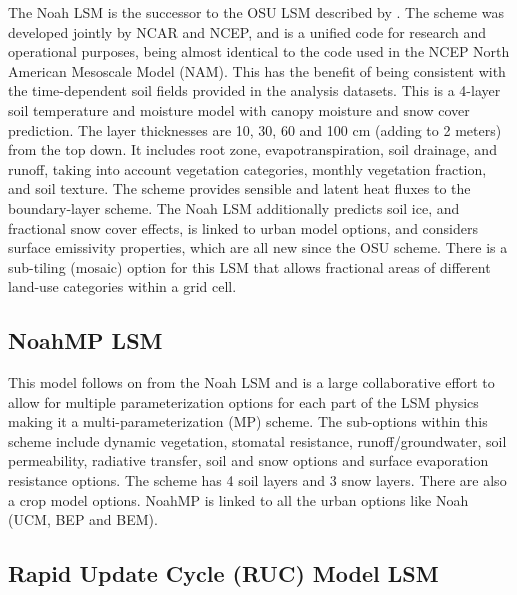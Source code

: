 The Noah LSM is the successor to the OSU LSM described by \citet{chendudhia01}. 
The scheme was developed jointly by NCAR and NCEP, and is a unified
code for research and operational purposes, being almost identical
to the code used in the NCEP North American Mesoscale Model (NAM). This has the benefit of 
being consistent with the time-dependent soil fields provided in the analysis datasets.
This is a 4-layer soil temperature and moisture model with canopy 
moisture and snow cover prediction. The layer thicknesses are 10, 30, 60 and 100 cm
(adding to 2 meters) from the top down. It includes root zone, evapotranspiration,
soil drainage, and runoff, taking into account vegetation categories,
monthly vegetation fraction, and soil texture. The scheme provides sensible and latent 
heat fluxes to the boundary-layer scheme. The Noah LSM additionally predicts 
soil ice, and fractional snow cover effects, is linked to urban model options,
and considers surface emissivity properties, which are all new since the OSU
scheme. There is a sub-tiling (mosaic) option for this LSM \citep{li13} that allows
fractional areas of different land-use categories within a grid cell.

\subsection{NoahMP LSM}

This model follows on from the Noah LSM and is a large collaborative effort \citep{niu11, yang11} to allow for multiple parameterization options
for each part of the LSM physics making it a multi-parameterization (MP) scheme. The sub-options within this scheme
include dynamic vegetation, stomatal resistance, runoff/groundwater, soil permeability, radiative transfer, soil and snow
options and surface evaporation resistance options. The scheme has 4 soil layers and 3 snow layers.
There are also a crop model options. NoahMP is linked to all the urban options like Noah (UCM, BEP and BEM).

\subsection{Rapid Update Cycle (RUC) Model LSM}

